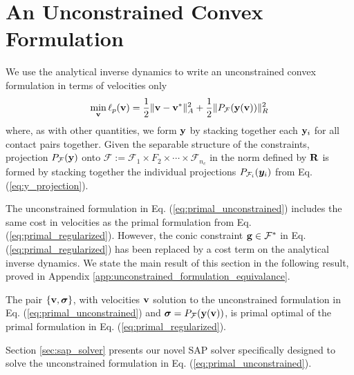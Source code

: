 \section{An Unconstrained Convex Formulation}
\label{sec:unconstrained_convex_formulation}

We use the analytical inverse dynamics to write an unconstrained convex
formulation in terms of velocities only
\begin{eqnarray}
	\min_{\mf{v}} \ell_p(\mf{v}) = \frac{1}{2}\Vert\mf{v}-\mf{v}^*\Vert_{A}^2 +
	\frac{1}{2}\Vert P_\mathcal{F}(\mf{y}(\mf{v}))\Vert_R^2
	\label{eq:primal_unconstrained}
\end{eqnarray}
where, as with other quantities, we form ${\mathbf{y}}$ by stacking together each
${\mathbf{y}}_i$ for all contact pairs together. Given the separable structure of the
constraints, projection $P_{\mathcal{F}}({\mathbf{y}})$ onto $\mathcal{F} :=
\mathcal{F}_1 \times F_2 \times \cdots \times \mathcal{F}_{n_c}$ in the norm
defined by ${\mathbf{R}}$ is formed by stacking together the individual projections
$P_{\mathcal{F}_i}({\bm{y}}_i)$ from Eq. (\ref{eq:y_projection}).

The unconstrained formulation in Eq. (\ref{eq:primal_unconstrained}) includes
the same cost in velocities as the primal formulation from Eq.
(\ref{eq:primal_regularized}). However, the conic constraint ${\mathbf{g}}\in
\mathcal{F}^*$ in Eq. (\ref{eq:primal_regularized}) has been replaced by a cost
term on the analytical inverse dynamics. We state the main result of this
section in the following result, proved in Appendix \ref{app:unconstrained_formulation_equivalance}.
\begin{theorem}
    The pair $\{{\mathbf{v}},{\bm\sigma}\}$, with velocities ${\mathbf{v}}$ solution to the
    unconstrained formulation in Eq. (\ref{eq:primal_unconstrained}) and
    ${\bm\sigma}=P_\mathcal{F}({\mathbf{y}}({\mathbf{v}}))$, is primal optimal of the primal
    formulation in Eq. (\ref{eq:primal_regularized}).
    \label{th:unconstrained_formulation_equivalance}
\end{theorem}

Section \ref{sec:sap_solver} presents our novel SAP  solver specifically designed to solve the
unconstrained formulation in Eq. (\ref{eq:primal_unconstrained}).
